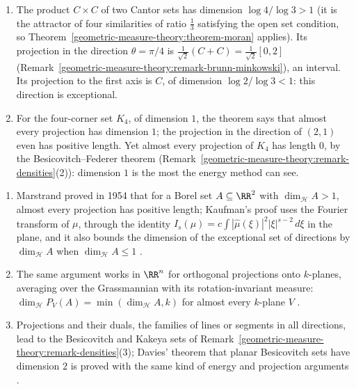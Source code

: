\begin{example}\label{geometric-measure-theory:example-marstrand}
\begin{enumerate}
\item The product $C \times C$ of two Cantor sets has dimension $\log 4/\log 3 > 1$ (it is the attractor of four similarities of ratio $\frac13$ satisfying the open set condition, so
Theorem~\ref{geometric-measure-theory:theorem-moran} applies). Its projection in the direction $\theta = \pi/4$ is $\frac1{\sqrt2}(C + C) = \frac1{\sqrt2}[0, 2]$ (Remark~\ref{geometric-measure-theory:remark-brunn-minkowski}),
an interval. Its projection to the first axis is $C$, of dimension $\log 2/\log 3 < 1$: this direction is exceptional.
\item For the four-corner set $K_4$, of dimension $1$, the theorem says that almost every projection has dimension $1$; the projection in the direction of $(2, 1)$ even has positive length. Yet almost
every projection of $K_4$ has length $0$, by the Besicovitch--Federer theorem (Remark~\ref{geometric-measure-theory:remark-densities}(2)): dimension $1$ is the most the energy method can see.
\end{enumerate}
\end{example}

\begin{remark}\label{geometric-measure-theory:remark-marstrand}
\begin{enumerate}
\item Marstrand proved in 1954 that for a Borel set $A \subseteq \RR^2$ with $\dim_{\mathcal{H}}A > 1$, almost every projection has positive length; Kaufman's proof uses the Fourier transform of $\mu$, through
the identity $I_s(\mu) = c\int|\hat\mu(\xi)|^2|\xi|^{s - 2}\,d\xi$ in the plane, and it also bounds the dimension of the exceptional set of directions by $\dim_{\mathcal{H}}A$ when $\dim_{\mathcal{H}}A \leq 1$
\cite[Chapter 9]{mattila-1995}.
\item The same argument works in $\RR^n$ for orthogonal projections onto $k$-planes, averaging over the Grassmannian with its rotation-invariant measure: $\dim_{\mathcal{H}}P_V(A) = \min(\dim_{\mathcal{H}}A, k)$ for
almost every $k$-plane $V$ \cite[Chapter 9]{mattila-1995}.
\item Projections and their duals, the families of lines or segments in all directions, lead to the Besicovitch and Kakeya sets of Remark~\ref{geometric-measure-theory:remark-densities}(3); Davies'
theorem that planar Besicovitch sets have dimension $2$ is proved with the same kind of energy and projection arguments \cite{falconer-gofs}.
\end{enumerate}
\end{remark}

